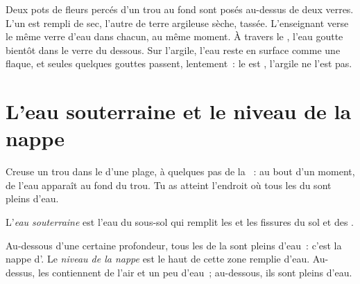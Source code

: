\begin{inthelab}
Deux pots de fleurs percés d'un trou au fond sont posés au-dessus de deux
verres. L'un est rempli de  sec, l'autre de terre argileuse sèche,
tassée. L'enseignant verse le même verre d'eau dans chacun, au même
moment. À travers le , l'eau goutte bientôt dans le verre du dessous.
Sur l'argile, l'eau reste en surface comme une flaque, et seules quelques
gouttes passent, lentement~: le  est , l'argile ne l'est
pas.
\end{inthelab}

\section{L'eau souterraine et le niveau de la nappe}

Creuse un trou dans le  d'une plage, à quelques pas de la ~: au
bout d'un moment, de l'eau apparaît au fond du trou. Tu as atteint
l'endroit où tous les  du  sont pleins d'eau.

\begin{definition}\label{def:g6:water-underground:groundwater}
L'\emph{eau souterraine} est l'eau du sous-sol qui
remplit les  et les fissures du sol et des .
\end{definition}

\begin{definition}\label{def:g6:water-underground:water-table}
Au-dessous d'une certaine profondeur, tous les  de la  sont
pleins d'eau~: c'est la nappe d'. Le
\emph{niveau de la nappe} est le haut de cette
zone remplie d'eau. Au-dessus, les  contiennent de l'air et un peu
d'eau~; au-dessous, ils sont pleins d'eau.
\end{definition}

